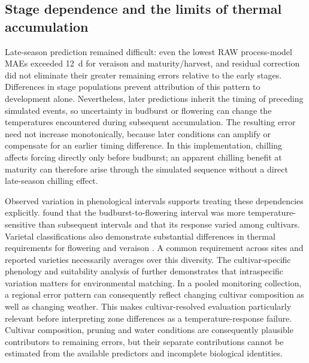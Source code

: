 \documentclass[a4paper,12pt]{article}
\let\OriginalSubsection\subsection
\renewcommand{\subsection}{\FloatBarrier\OriginalSubsection}
\begin{document}
\subsection{Stage dependence and the limits of thermal accumulation}

Late-season prediction remained difficult: even the lowest RAW process-model MAEs exceeded 12~d for veraison and maturity/harvest, and residual correction did not eliminate their greater remaining errors relative to the early stages. Differences in stage populations prevent attribution of this pattern to development alone. Nevertheless, later predictions inherit the timing of preceding simulated events, so uncertainty in budburst or flowering can change the temperatures encountered during subsequent accumulation. The resulting error need not increase monotonically, because later conditions can amplify or compensate for an earlier timing difference. In this implementation, chilling affects forcing directly only before budburst; an apparent chilling benefit at maturity can therefore arise through the simulated sequence without a direct late-season chilling effect.

Observed variation in phenological intervals supports treating these dependencies explicitly. \citet{cameronEffectTemperatureGrapevine2022} found that the budburst-to-flowering interval was more temperature-sensitive than subsequent intervals and that its response varied among cultivars. Varietal classifications also demonstrate substantial differences in thermal requirements for flowering and veraison \citep{parkerClassificationVarietiesTheir2013}. A common requirement across sites and reported varieties necessarily averages over this diversity. The cultivar-specific phenology and suitability analysis of \citet{moralesCastillaDiversity2020} further demonstrates that intraspecific variation matters for environmental matching. In a pooled monitoring collection, a regional error pattern can consequently reflect changing cultivar composition as well as changing weather. This makes cultivar-resolved evaluation particularly relevant before interpreting zone differences as a temperature-response failure. Cultivar composition, pruning and water conditions are consequently plausible contributors to remaining errors, but their separate contributions cannot be estimated from the available predictors and incomplete biological identities.
\end{document}
